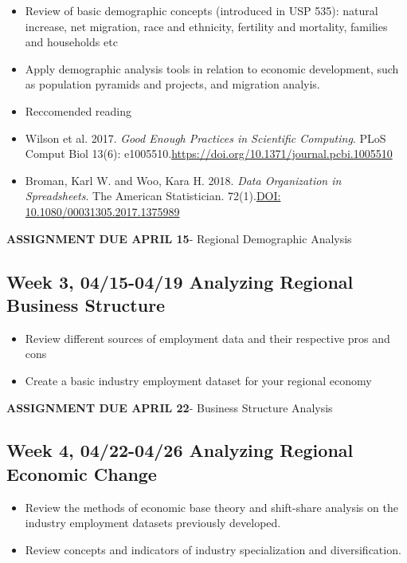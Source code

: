 \documentclass[11pt,]{article}
\providecommand{\tightlist}{%
  \setlength{\itemsep}{0pt}\setlength{\parskip}{0pt}}
\begin{document}
\begin{itemize}
\item
  Review of basic demographic concepts (introduced in USP 535): natural
  increase, net migration, race and ethnicity, fertility and mortality,
  families and households etc
\item
  Apply demographic analysis tools in relation to economic development,
  such as population pyramids and projects, and migration analyis.
\item
  Reccomended reading
\item
  Wilson et al. 2017. \emph{Good Enough Practices in Scientific
  Computing}. PLoS Comput Biol 13(6):
  e1005510.\url{https://doi.org/10.1371/journal.pcbi.1005510}
\item
  Broman, Karl W. and Woo, Kara H. 2018. \emph{Data Organization in
  Spreadsheets}. The American Statistician.
  72(1).\href{10.1080/00031305.2017.1375989}{DOI:
  10.1080/00031305.2017.1375989}
\end{itemize}

\textbf{ASSIGNMENT DUE APRIL 15}- Regional Demographic Analysis

\subsection{Week 3, 04/15-04/19 Analyzing Regional Business
Structure}\label{week-3-0415-0419-analyzing-regional-business-structure}

\begin{itemize}
\tightlist
\item
  Review different sources of employment data and their respective pros
  and cons
\item
  Create a basic industry employment dataset for your regional economy
\end{itemize}

\textbf{ASSIGNMENT DUE APRIL 22}- Business Structure Analysis

\subsection{Week 4, 04/22-04/26 Analyzing Regional Economic
Change}\label{week-4-0422-0426-analyzing-regional-economic-change}

\begin{itemize}
\item
  Review the methods of economic base theory and shift-share analysis on
  the industry employment datasets previously developed.
\item
  Review concepts and indicators of industry specialization and
  diversification.
\end{itemize}
\end{document}
